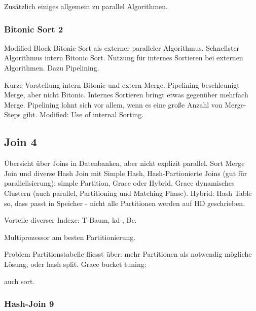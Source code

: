 \documentclass[a4paper,12pt,twoside]{article}
\begin{document}
Zusätzlich einiges allgemein zu parallel Algorithmen.


\subsubsection{Bitonic Sort 2}
\textbf{}

Modified Block Bitonic Sort als externer paralleler Algorithmus. Schnellster Algorithmus intern Bitonic Sort. Nutzung für internes Sortieren bei externen Algorithmen. Dazu Pipelining.

Kurze Vorstellung intern Bitonic und extern Merge. Pipelining beschleunigt Merge, aber nicht Bitonic. Internes Sortieren bringt etwas gegenüber mehrfach Merge. Pipelining lohnt sich vor allem, wenn es eine große Anzahl von Merge-Steps gibt. Modified: Use of internal Sorting. 

\subsection{Join 4}
\textbf{}

Übersicht über Joins in Datenbanken, aber nicht explizit parallel. Sort Merge Join und diverse Hash Join mit Simple Hash, Hash-Partionierte Joins (gut für parallelisierung): simple Partition, Grace oder Hybrid, Grace dynamisches Clustern (auch parallel, Partitioning und Matching Phase). Hybrid: Hash Table so, dass passt in Speicher - nicht alle Partitionen werden auf HD geschrieben.

Vorteile diverser Indexe: T-Baum, kd-, Bc. 

Multiprozessor am besten Partitionierung.

Problem Partitionstabelle fliesst über: mehr Partitionen als notwendig mögliche Lösung, oder hash split. Grace bucket tuning:  




\textbf{}


\textbf{}
auch sort. 


\subsubsection{Hash-Join 9}
\textbf{}


\textbf{}


\textbf{}
\end{document}
